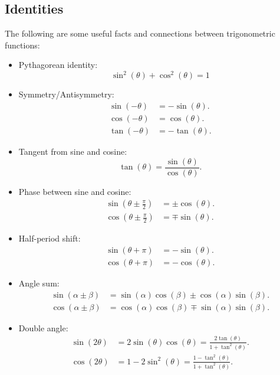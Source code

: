 \subsection{Identities}
The following are some useful facts and connections between trigonometric functions:
\begin{itemize}
	\item Pythagorean identity:
		\begin{equation}
			\sin^{2}(\theta) + \cos^{2}(\theta) = 1
		\end{equation}
	
	\item Symmetry/Antisymmetry:
		\begin{align}
			\sin(-\theta) &= -\sin(\theta).\\
			\cos(-\theta) &= \cos(\theta).\\
			\tan(-\theta) &= -\tan(\theta).
		\end{align}
	
	\item Tangent from sine and cosine:
		\begin{equation}
			\tan(\theta)=\frac{\sin(\theta)}{\cos(\theta)}.
		\end{equation}
	
	\item Phase between sine and cosine:
		\begin{align}
			\sin\left(\theta\pm\frac{\pi}{2}\right) &= \pm\cos(\theta).\\
			\cos\left(\theta\pm\frac{\pi}{2}\right) &= \mp\sin(\theta).
		\end{align}
	
	\item Half-period shift:
		\begin{align}
			\sin(\theta+\pi) &= -\sin(\theta).\\
			\cos(\theta+\pi) &= -\cos(\theta).
		\end{align}
	
	\item Angle sum:
		\begin{align}
			\sin(\alpha\pm\beta) &= \sin(\alpha)\cos(\beta)\pm\cos(\alpha)\sin(\beta).\\
			\cos(\alpha\pm\beta) &= \cos(\alpha)\cos(\beta)\mp\sin(\alpha)\sin(\beta).
		\end{align}
	
	\item Double angle:
		\begin{align}
			\sin(2\theta) &= 2\sin(\theta)\cos(\theta) = \frac{2\tan \left( \theta \right)}{1+\tan^{2} \left( \theta \right)}.\\
			\cos(2\theta) &= 1-2\sin^{2}(\theta) = \frac{1-\tan^{2} \left( \theta \right) }{1+\tan^{2} \left( \theta \right)}.
			\label{eq:double_angles}
		\end{align}
	

\end{itemize}
